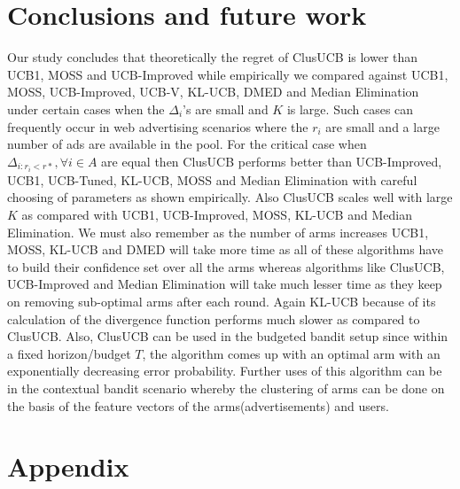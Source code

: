 \documentclass[twoside]{article}
\begin{document}
\section{Conclusions and future work}
\label{sec:conclusions}
Our study concludes that theoretically the regret of ClusUCB is lower than UCB1, MOSS and UCB-Improved while empirically we compared against UCB1, MOSS, UCB-Improved, UCB-V, KL-UCB, DMED and Median Elimination under certain cases when the $\Delta_{i}$'s are small and $K$ is large. Such cases can frequently occur in web advertising scenarios where the $r_{i}$ are small and a large number of ads are available in the pool. For the critical case when $\Delta_{i:r_{i}<r*}, \forall i\in A$ are equal then ClusUCB performs better than UCB-Improved, UCB1, UCB-Tuned, KL-UCB, MOSS and Median Elimination with careful choosing  of parameters as shown empirically. Also ClusUCB scales well with large $K$ as compared with UCB1, UCB-Improved, MOSS, KL-UCB and Median Elimination. We must also remember as the number of arms increases UCB1, MOSS, KL-UCB and DMED will take more time as all of these algorithms have to build their confidence set over all the arms whereas algorithms like ClusUCB, UCB-Improved and Median Elimination 
will take much lesser time as they keep on removing sub-optimal arms after each round. Again KL-UCB because of its calculation of the divergence function performs much slower as compared to ClusUCB. Also, ClusUCB can be used in the budgeted bandit setup since within a fixed horizon/budget $T$, the algorithm comes up with an optimal arm with an exponentially decreasing error probability. Further uses of this algorithm can be in the contextual bandit scenario whereby the clustering of arms can be done on the basis of the feature vectors of the arms(advertisements) and users.







\clearpage
\newpage
\onecolumn
\section*{Appendix}


\end{document}
